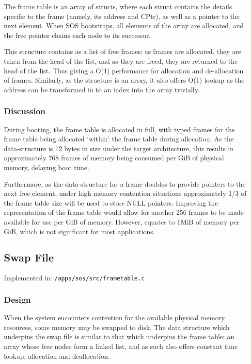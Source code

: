 \documentclass[a4paper,12pt]{article}
\begin{document}
The frame table is an array of structs, where each struct contains the details
specific to the frame (namely, its address and CPtr), as well as a pointer to
the next element.  When SOS bootstraps, all elements of the array are
allocated, and the free pointer chains each node to its successor.

This structure contains as a list of free frames: as frames are allocated,
they are taken from the head of the list, and as they are freed, they are
returned to the head of the list.  Thus giving a O(1) performance for
allocation and de-allocation of frames.  Similarly, as the structure is an
array, it also offers O(1) lookup as the address can be transformed in to an
index into the array trivially.

\subsubsection{Discussion}
During booting, the frame table is allocated in full, with typed frames for
the frame table being allocated `within' the frame table during allocation.
As the data-structure is 12 bytes in size under the target architecture, this
results in approximately 768 frames of memory being consumed per GiB of
physical memory, delaying boot time.

Furthermore, as the data-structure for a frame doubles to provide pointers to
the next free element, under high memory contention situations approximately
1/3 of the frame table size will be used to store NULL pointers.  Improving
the representation of the frame table would allow for another 256 frames to be
made available for use per GiB of memory.  However, equates to 1MiB of memory
per GiB, which is not significant for most applications.

\subsection{Swap File}
Implemented in: \texttt{/apps/sos/src/frametable.c}

\subsubsection{Design}
When the system encounters contention for the available physical memory
resources, some memory may be swapped to disk.  The data structure which
underpins the swap file is similar to that which underpins the frame table: an
array whose free nodes form a linked list, and as such also offers constant
time lookup, allocation and deallocation.
\end{document}

